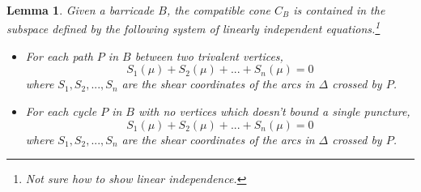 \documentclass{amsart}
\newtheorem{corollary}[proposition]{Corollary}
\newtheorem{lemma}[proposition]{Lemma}
\theoremstyle{definition}
\newtheorem{definition}[proposition]{Definition}
\theoremstyle{remark}
\numberwithin{equation}{section}
\newcommand{\newword}[1]{\textbf{\emph{#1}}}
\newcommand{\0}{{\mathbf{0}}}
\newcommand{\M}{\mathbf{M}}
\renewcommand{\S}{\mathbf{S}}
\begin{document}
\begin{lemma}
Given a barricade $B$, the compatible cone $C_B$ is contained in the subspace defined by the following system of linearly independent equations.\footnote{Not sure how to show linear independence.}
\begin{itemize}
	\item For each path $P$ in $B$ between two trivalent vertices, 
	\[ S_{1}(\mu) + S_{2}(\mu) + ... + S_{n}(\mu) = 0\]
	where $S_1, S_2,...,S_n$ are the shear coordinates of the arcs in $\Delta$ crossed by $P$.
	\item For each cycle $P$ in $B$ with no vertices which doesn't bound a single puncture,
	\[ S_{1}(\mu) + S_{2}(\mu) + ... + S_{n}(\mu) = 0\]
	where $S_1, S_2,...,S_n$ are the shear coordinates of the arcs in $\Delta$ crossed by $P$.
\end{itemize}
\end{lemma}

\end{document}
